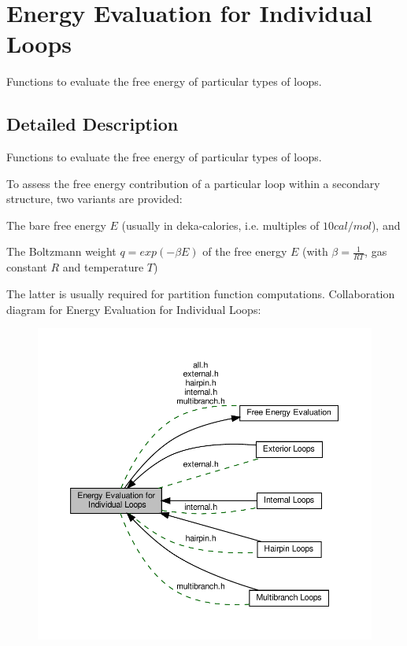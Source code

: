 \hypertarget{group__eval__loops}{}\section{Energy Evaluation for Individual Loops}
\label{group__eval__loops}


Functions to evaluate the free energy of particular types of loops.  




\subsection{Detailed Description}
Functions to evaluate the free energy of particular types of loops. 

To assess the free energy contribution of a particular loop within a secondary structure, two variants are provided\+:
\begin{DoxyItemize}
\item The {\ttfamily bare} free energy $E$ (usually in deka-\/calories, i.\+e. multiples of $10 cal/mol$), and
\item The {\ttfamily Boltzmann weight} $q = exp(-\beta E)$ of the free energy $E$ (with $\beta = \frac{1}{RT}$, gas constant $R$ and temperature $T$)
\end{DoxyItemize}

The latter is usually required for partition function computations. Collaboration diagram for Energy Evaluation for Individual Loops\+:
\nopagebreak
\begin{figure}[H]
\begin{center}
\leavevmode
\includegraphics[width=350pt]{group__eval__loops}
\end{center}
\end{figure}
